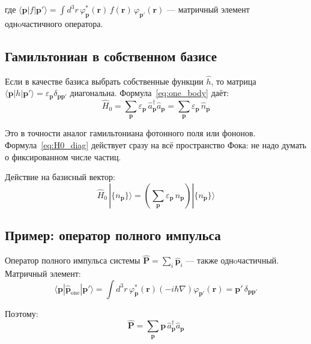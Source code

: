 \documentclass[../general/general]{subfiles}
\begin{document}
где $\langle\mathbf{p}|f|\mathbf{p}'\rangle = \int d^3r\,\varphi^*_\mathbf{p}(\mathbf{r})\,f(\mathbf{r})\,\varphi_{\mathbf{p}'}(\mathbf{r})$ --- матричный элемент однoчастичного оператора.

\subsection{Гамильтониан в собственном базисе}

Если в качестве базиса выбрать собственные функции $\hat{h}$, то матрица $\langle\mathbf{p}|h|\mathbf{p}'\rangle = \varepsilon_\mathbf{p}\delta_{\mathbf{p}\mathbf{p}'}$ диагональна. Формула~\eqref{eq:one_body} даёт:
\begin{equation}
    \hat{H}_0 = \sum_\mathbf{p} \varepsilon_\mathbf{p}\,\hat{a}^\dagger_\mathbf{p}\hat{a}_\mathbf{p} = \sum_\mathbf{p} \varepsilon_\mathbf{p}\,\hat{n}_\mathbf{p}
    \label{eq:H0_diag}
\end{equation}

Это в точности аналог гамильтониана фотонного поля или фононов. Формула~\eqref{eq:H0_diag} действует сразу на всё пространство Фока: не надо думать о фиксированном числе частиц.

Действие на базисный вектор:
\begin{equation}
    \hat{H}_0\,|\{n_\mathbf{p}\}\rangle = \left(\sum_\mathbf{p} \varepsilon_\mathbf{p}\,n_\mathbf{p}\right)|\{n_\mathbf{p}\}\rangle
\end{equation}

\subsection{Пример: оператор полного импульса}

Оператор полного импульса системы $\hat{\mathbf{P}} = \sum_i \hat{\mathbf{p}}_i$ --- также однoчастичный. Матричный элемент:
\begin{equation}
    \langle\mathbf{p}|\hat{\mathbf{p}}_{\text{one}}|\mathbf{p}'\rangle = \int d^3r\,\varphi^*_\mathbf{p}(\mathbf{r})\!\left(-i\hbar\nabla\right)\varphi_{\mathbf{p}'}(\mathbf{r}) = \mathbf{p}'\,\delta_{\mathbf{p}\mathbf{p}'}
\end{equation}

Поэтому:
\begin{equation}
    \hat{\mathbf{P}} = \sum_\mathbf{p} \mathbf{p}\,\hat{a}^\dagger_\mathbf{p}\hat{a}_\mathbf{p}
\end{equation}

\end{document}

